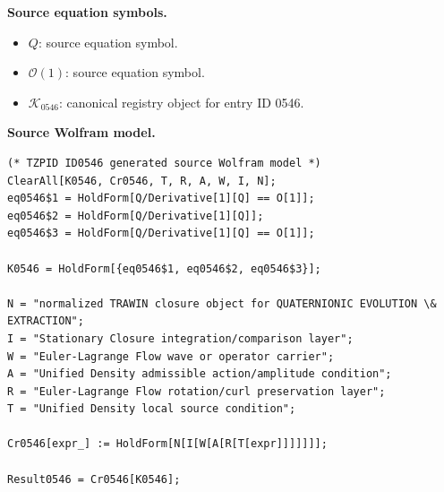 \begin{minipage}[t]{0.49\linewidth}
\begingroup
\small
\raggedright
\textbf{Source equation symbols.}\par
\begin{itemize}[leftmargin=1.35em,itemsep=1pt,topsep=1pt,parsep=0pt]
    \item $Q$: source equation symbol.
    \item $\mathcal{O}(1)$: source equation symbol.
    \item $\mathcal{K}_{0546}$: canonical registry object for entry ID 0546.
\end{itemize}
\endgroup
\end{minipage}\hfill
\begin{minipage}[t]{0.47\linewidth}
\begingroup
\scriptsize
\raggedright
\textbf{Source Wolfram model.}\par
\begin{Verbatim}[fontsize=\tiny,breaklines=true,breakanywhere=true]
(* TZPID ID0546 generated source Wolfram model *)
ClearAll[K0546, Cr0546, T, R, A, W, I, N];
eq0546$1 = HoldForm[Q/Derivative[1][Q] == O[1]];
eq0546$2 = HoldForm[Q/Derivative[1][Q]];
eq0546$3 = HoldForm[Q/Derivative[1][Q] == O[1]];

K0546 = HoldForm[{eq0546$1, eq0546$2, eq0546$3}];

N = "normalized TRAWIN closure object for QUATERNIONIC EVOLUTION \& EXTRACTION";
I = "Stationary Closure integration/comparison layer";
W = "Euler-Lagrange Flow wave or operator carrier";
A = "Unified Density admissible action/amplitude condition";
R = "Euler-Lagrange Flow rotation/curl preservation layer";
T = "Unified Density local source condition";

Cr0546[expr_] := HoldForm[N[I[W[A[R[T[expr]]]]]]];

Result0546 = Cr0546[K0546];
\end{Verbatim}
\endgroup
\end{minipage}

